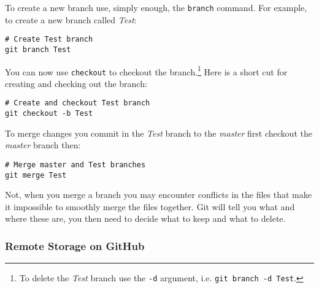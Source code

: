 To create a new branch use, simply enough, the \texttt{branch} command. For example, to create a new branch called \emph{Test}:

\begin{knitrout}
\color{fgcolor}\begin{kframe}
\begin{verbatim}
# Create Test branch
git branch Test
\end{verbatim}
\end{kframe}
\end{knitrout}


\noindent You can now use \texttt{checkout} to checkout the branch.\footnote{To delete the \emph{Test} branch use the \texttt{-d} argument, i.e. \texttt{git branch -d Test}.} Here is a short cut for creating and checking out the branch:

\begin{knitrout}
\color{fgcolor}\begin{kframe}
\begin{verbatim}
# Create and checkout Test branch
git checkout -b Test
\end{verbatim}
\end{kframe}
\end{knitrout}


\noindent To merge changes you commit in the \emph{Test} branch to the \emph{master} first checkout the \emph{master} branch then:

\begin{knitrout}
\color{fgcolor}\begin{kframe}
\begin{verbatim}
# Merge master and Test branches
git merge Test
\end{verbatim}
\end{kframe}
\end{knitrout}


\noindent Not, when you merge a branch you may encounter conflicts in the files that make it impossible to smoothly merge the files together. Git will tell you what and where these are, you then need to decide what to keep and what to delete.

\subsubsection{Remote Storage on GitHub}

